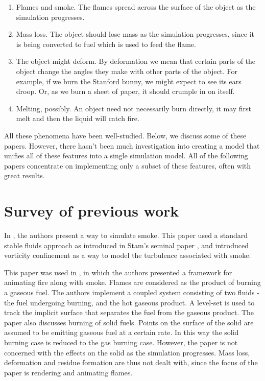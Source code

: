 \documentclass[12pt]{report}
\begin{document}
\begin{enumerate}
  \item Flames and smoke. The flames spread across the surface of the object as the simulation progresses.
  \item Mass loss. The object should lose mass as the simulation progresses, since it is being converted to fuel which is used to feed the flame.
  \item The object might deform. By deformation we mean that certain parts of the object change the angles they make with other parts of the object. For example, if we burn the Stanford bunny, we might expect to see its ears droop. Or, as we burn a sheet of paper, it should crumple in on itself.
  \item Melting, possibly. An object need not necessarily burn directly, it may first melt and then the liquid will catch fire.
\end{enumerate}

All these phenomena have been well-studied. Below, we discuss some of these papers. However, there hasn't been much investigation into creating a model that unifies all of these features into a single simulation model. All of the following papers concentrate on implementing only a subset of these features, often with great results.


\section{Survey of previous work} %
\label{sec:survey_of_previous_work}

In \cite{festje}, the authors present a way to simulate smoke. This paper used a standard stable fluids approach as introduced in Stam's seminal paper \cite{stam}, and introduced vorticity confinement as a way to model the turbulence associated with smoke.

This paper was used in \cite{ngfeje}, in which the authors presented a framework for animating fire along with smoke. Flames are considered as the product of burning a gaseous fuel. The authors implement a coupled system consisting of two fluids - the fuel undergoing burning, and the hot gaseous product. A level-set is used to track the implicit surface that separates the fuel from the gaseous product. The paper also discusses burning of solid fuels. Points on the surface of the solid are assumed to be emitting gaseous fuel at a certain rate. In this way the solid burning case is reduced to the gas burning case. However, the paper is not concerned with the effects on the solid as the simulation progresses. Mass loss, deformation and residue formation are thus not dealt with, since the focus of the paper is rendering and animating flames.
\end{document}
